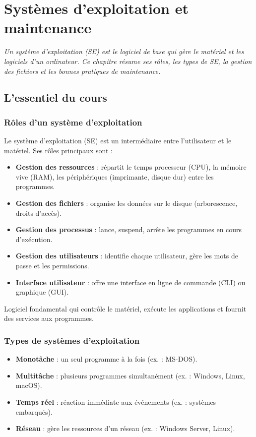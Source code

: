 \chapter{Systèmes d'exploitation et maintenance}

\textit{Un système d'exploitation (SE) est le logiciel de base qui gère le matériel et les logiciels d'un ordinateur. Ce chapitre résume ses rôles, les types de SE, la gestion des fichiers et les bonnes pratiques de maintenance.}

\section{L'essentiel du cours}

\subsection{Rôles d'un système d'exploitation}
Le système d'exploitation (SE) est un intermédiaire entre l'utilisateur et le matériel. Ses rôles principaux sont :
\begin{itemize}
    \item \textbf{Gestion des ressources} : répartit le temps processeur (CPU), la mémoire vive (RAM), les périphériques (imprimante, disque dur) entre les programmes.
    \item \textbf{Gestion des fichiers} : organise les données sur le disque (arborescence, droits d'accès).
    \item \textbf{Gestion des processus} : lance, suspend, arrête les programmes en cours d'exécution.
    \item \textbf{Gestion des utilisateurs} : identifie chaque utilisateur, gère les mots de passe et les permissions.
    \item \textbf{Interface utilisateur} : offre une interface en ligne de commande (CLI) ou graphique (GUI).
\end{itemize}

\begin{definition}
Logiciel fondamental qui contrôle le matériel, exécute les applications et fournit des services aux programmes.
\end{definition}

\subsection{Types de systèmes d'exploitation}
\begin{itemize}
    \item \textbf{Monotâche} : un seul programme à la fois (ex. : MS-DOS).
    \item \textbf{Multitâche} : plusieurs programmes simultanément (ex. : Windows, Linux, macOS).
    \item \textbf{Temps réel} : réaction immédiate aux événements (ex. : systèmes embarqués).
    \item \textbf{Réseau} : gère les ressources d'un réseau (ex. : Windows Server, Linux).
\end{itemize}

